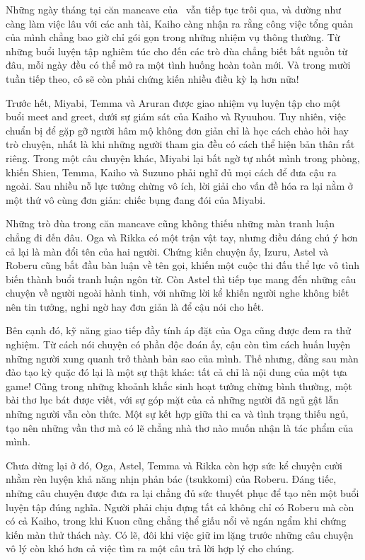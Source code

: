 \documentclass[main.tex]{subfiles}
\begin{document}
\color{black}

Những ngày tháng tại căn mancave của \hls\ vẫn tiếp tục trôi qua, và dường như càng làm việc lâu với các anh tài, Kaiho càng nhận ra rằng công việc tổng quản của mình chẳng bao giờ chỉ gói gọn trong những nhiệm vụ thông thường. Từ những buổi luyện tập nghiêm túc cho đến các trò đùa chẳng biết bắt nguồn từ đâu, mỗi ngày đều có thể mở ra một tình huống hoàn toàn mới. Và trong mười tuần tiếp theo, cô sẽ còn phải chứng kiến nhiều điều kỳ lạ hơn nữa!

Trước hết, Miyabi, Temma và Aruran được giao nhiệm vụ luyện tập cho một buổi meet and greet, dưới sự giám sát của Kaiho và Ryuuhou. Tuy nhiên, việc chuẩn bị để gặp gỡ người hâm mộ không đơn giản chỉ là học cách chào hỏi hay trò chuyện, nhất là khi những người tham gia đều có cách thể hiện bản thân rất riêng. Trong một câu chuyện khác, Miyabi lại bất ngờ tự nhốt mình trong phòng, khiến Shien, Temma, Kaiho và Suzuno phải nghĩ đủ mọi cách để đưa cậu ra ngoài. Sau nhiều nỗ lực tưởng chừng vô ích, lời giải cho vấn đề hóa ra lại nằm ở một thứ vô cùng đơn giản: chiếc bụng đang đói của Miyabi.

Những trò đùa trong căn mancave cũng không thiếu những màn tranh luận chẳng đi đến đâu. Oga và Rikka có một trận vật tay, nhưng điều đáng chú ý hơn cả lại là màn đổi tên của hai người. Chứng kiến chuyện ấy, Izuru, Astel và Roberu cũng bắt đầu bàn luận về tên gọi, khiến một cuộc thi đấu thể lực vô tình biến thành buổi tranh luận ngôn từ. Còn Astel thì tiếp tục mang đến những câu chuyện về người ngoài hành tinh, với những lời kể khiến người nghe không biết nên tin tưởng, nghi ngờ hay đơn giản là để cậu nói cho hết.

Bên cạnh đó, kỹ năng giao tiếp đầy tính áp đặt của Oga cũng được đem ra thử nghiệm. Từ cách nói chuyện có phần độc đoán ấy, cậu còn tìm cách huấn luyện những người xung quanh trở thành bản sao của mình. Thế nhưng, đằng sau màn đào tạo kỳ quặc đó lại là một sự thật khác: tất cả chỉ là nội dung của một tựa game! Cũng trong những khoảnh khắc sinh hoạt tưởng chừng bình thường, một bài thơ lục bát được viết, với sự góp mặt của cả những người đã ngủ gật lẫn những người vẫn còn thức. Một sự kết hợp giữa thi ca và tình trạng thiếu ngủ, tạo nên những vần thơ mà có lẽ chẳng nhà thơ nào muốn nhận là tác phẩm của mình.

Chưa dừng lại ở đó, Oga, Astel, Temma và Rikka còn hợp sức kể chuyện cười nhằm rèn luyện khả năng nhịn phản bác (tsukkomi) của Roberu. Đáng tiếc, những câu chuyện được đưa ra lại chẳng đủ sức thuyết phục để tạo nên một buổi luyện tập đúng nghĩa. Người phải chịu đựng tất cả không chỉ có Roberu mà còn có cả Kaiho, trong khi Kuon cũng chẳng thể giấu nổi vẻ ngán ngẩm khi chứng kiến màn thử thách này. Có lẽ, đôi khi việc giữ im lặng trước những câu chuyện vô lý còn khó hơn cả việc tìm ra một câu trả lời hợp lý cho chúng.
\end{document}
